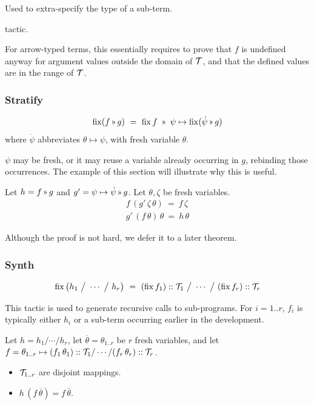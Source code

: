 Used to extra-specify the type of a sub-term.

\Obligations tactic.

For arrow-typed terms, this essentially requires to prove that $f$ is undefined anyway for
argument values outside the domain of $\mathcal{T}$, and that the defined values are in the range of $\mathcal{T}$.

\subsubsection{Stratify} \label{tactics:Stratify}
\[\fix (f\applt g) ~=~ \fix f ~\applt~ \psi\mapsto \fix (\dot\psi\applt g)\]
%
where $\dot\psi$ abbreviates $\theta\mapsto\psi$, with fresh variable $\theta$.

$\psi$ may be fresh, or it may reuse a variable already occurring in $g$, rebinding those occurrences.
The example of this section will illustrate why this is useful.

\Obligations Let $h=f\applt g$ and $g'=\psi\mapsto\dot\psi\applt g$. Let $\theta,\zeta$ be
fresh variables.
\begin{equation}
\renewcommand\arraystretch{1.5}
\begin{array}{l}
f\,(g'\,\zeta\,\theta) ~=~ f\,\zeta \\
g'\,(f\,\theta)\,\theta ~=~ h\,\theta
\end{array}
\label{tactics:Stratify obligations}
\end{equation}

Although the proof is not hard, we defer it to a later theorem.

\subsubsection{Synth} \label{tactics:Synth}
\[\operatorname{fix}\big(h_1 ~\big/~ \cdots ~\big/~ h_r\big) ~=~ 
  (\operatorname{fix} f_1) :: \mathcal{T}_1 ~\big/~ \cdots ~\big/~ (\operatorname{fix} f_r) :: \mathcal{T}_r\]

This tactic is used to generate recursive calls to sub-programs. For $i=1..r$, $f_i$
is typically either $h_i$ or a sub-term occurring earlier in the development.

\Obligations Let $h=h_1/\cdots/h_r$, let $\overline\theta\!=\!\theta_{1..r}$ be $r$ fresh variables, and let
$f = \theta_{1..r} \mapsto (f_1\,\theta_1)::\mathcal{T}_1/\cdots/(f_r\,\theta_r)::\mathcal{T}_r$.
\begin{itemize}
  \item $\mathcal{T}_{1..r}$ are disjoint mappings.
  \item $h\,(f\,\overline\theta) = f\,\overline\theta$.
\end{itemize}

